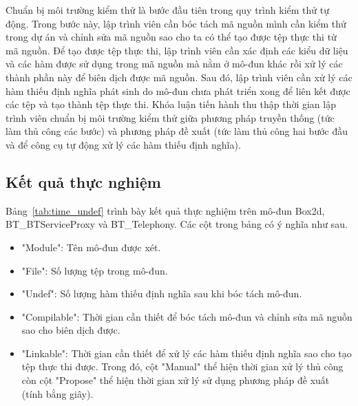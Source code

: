Chuẩn bị môi trường kiểm thử là bước đầu tiên trong quy trình kiểm thử tự động. Trong bước này, lập trình viên cần bóc tách mã nguồn mình cần kiểm thử trong dự án và chỉnh sửa mã nguồn sao cho ta có thể tạo được tệp thực thi từ mã nguồn. Để tạo được tệp thực thi, lập trình viên cần xác định các kiểu dữ liệu và các hàm được sử dụng trong mã nguồn mà nằm ở mô-đun khác rồi xử lý các thành phần này để biên dịch được mã nguồn. Sau đó, lập trình viên cần xử lý các hàm thiếu định nghĩa phát sinh do mô-đun chưa phát triển xong để liên kết được các tệp và tạo thành tệp thực thi. Khóa luận tiến hành thu thập thời gian lập trình viên chuẩn bị môi trường kiểm thử giữa phương pháp truyền thống (tức làm thủ công các bước) và phương pháp đề xuất (tức làm thủ công hai bước đầu và để công cụ tự động xử lý các hàm thiếu định nghĩa).
\subsection{Kết quả thực nghiệm}
Bảng~\ref{tab:time_undef} trình bày kết quả thực nghiệm trên mô-đun Box2d, BT\_BTServiceProxy và BT\_Telephony. Các cột trong bảng có ý nghĩa như sau.
\begin{itemize}
    \item "Module": Tên mô-đun được xét.
    \item "File": Số lượng tệp trong mô-đun.
    \item "Undef": Số lượng hàm thiếu định nghĩa sau khi bóc tách mô-đun.
    \item "Compilable": Thời gian cần thiết để bóc tách mô-đun và chỉnh sửa mã nguồn sao cho biên dịch được.
    \item "Linkable": Thời gian cần thiết để xử lý các hàm thiếu định nghĩa sao cho tạo tệp thực thi được. Trong đó, cột "Manual" thể hiện thời gian xử lý thủ công còn cột "Propose" thể hiện thời gian xử lý sử dụng phương pháp đề xuất (tính bằng giây).
\end{itemize}

